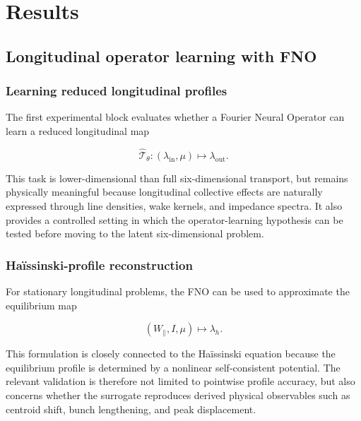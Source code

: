 
\chapter{Results}
\label{sec:05_results_results}

\section{Longitudinal operator learning with FNO}
\label{sec:05_results_longitudinal_operator_learning_with_fno}

\subsection{Learning reduced longitudinal profiles}
\label{sec:05_results_learning_reduced_longitudinal_profiles}

The first experimental block evaluates whether a Fourier Neural Operator can learn a reduced longitudinal map

\begin{equation}
\label{eq:172}
\widehat{\mathcal T}_{\theta}:(\lambda_{\mathrm{in}},\mu)\mapsto\lambda_{\mathrm{out}}.
\end{equation}

This task is lower-dimensional than full six-dimensional transport, but remains physically meaningful because longitudinal collective effects are naturally expressed through line densities, wake kernels, and impedance spectra. It also provides a controlled setting in which the operator-learning hypothesis can be tested before moving to the latent six-dimensional problem.

\subsection{Haïssinski-profile reconstruction}
\label{sec:05_results_ha_ssinski_profile_reconstruction}

For stationary longitudinal problems, the FNO can be used to approximate the equilibrium map

\begin{equation}
\label{eq:173}
(W_{\parallel},I,\mu)\mapsto\lambda_h.
\end{equation}

This formulation is closely connected to the Haïssinski equation because the equilibrium profile is determined by a nonlinear self-consistent potential. The relevant validation is therefore not limited to pointwise profile accuracy, but also concerns whether the surrogate reproduces derived physical observables such as centroid shift, bunch lengthening, and peak displacement.

